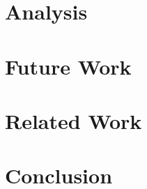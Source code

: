 \documentclass[letterpaper,twocolumn,10pt]{article}
\begin{document}
\section{Analysis}

\section{Future Work}

\section{Related Work}

\section{Conclusion}
\end{document}
